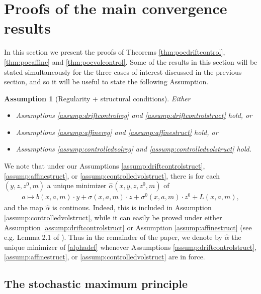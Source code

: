 \documentclass[11pt,reqno]{amsart}
\numberwithin{equation}{section}
\newtheorem{assumption}[theorem]{Assumption}
\theoremstyle{definition}
\begin{document}
\section{Proofs of the main convergence results}
\label{sec:proofs}
In this section we present the proofs of Theorems \ref{thm:pocdriftcontrol}, \ref{thm:pocaffine} and \ref{thm:pocvolcontrol}. Some of the results in this section will be stated simultaneously for the three cases of interest discussed in the previous section, and so it will be useful to state the following Assumption.
\begin{assumption}[Regularity + structural conditions] \label{assump:mixed}
Either
\begin{itemize}
    \item Assumptions \ref{assump:driftcontrolreg} and \ref{assump:driftcontrolstruct} hold, or
    \item Assumptions \ref{assump:affinereg} and \ref{assump:affinestruct} hold, or 
    \item Assumptions \ref{assump:controlledvolreg} and \ref{assump:controlledvolstruct} hold.
\end{itemize}
\end{assumption}

We note that under our Assumptions \ref{assump:driftcontrolstruct}, \ref{assump:affinestruct}, or \ref{assump:controlledvolstruct}, there is for each $(y,z,z^0,m)$ a unique minimizer $\hat{\alpha}(x,y,z,z^0,m)$ of 
\begin{align} \label{alphadef}
a \mapsto b(x,a,m) \cdot y + \sigma(x,a,m) \cdot z + \sigma^0(x,a,m) \cdot z^0 + L(x,a,m), 
\end{align}
and the map $\hat{\alpha}$ is continous. Indeed, this is included in Assumption \ref{assump:controlledvolstruct}, while it can easily be proved under either Assumption \ref{assump:driftcontrolstruct} or Assumption \ref{assump:affinestruct} (see e.g. Lemma 2.1 of \cite{cardelsicon}). Thus in the remainder of the paper, we denote by $\hat{\alpha}$ the unique minimizer of \eqref{alphadef} whenever Assumptions \ref{assump:driftcontrolstruct}, \ref{assump:affinestruct}, or \ref{assump:controlledvolstruct} are in force.


\subsection{The stochastic maximum principle}
\label{subsec:smp}
\end{document}
